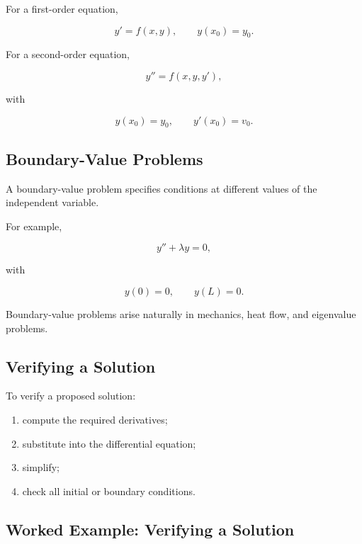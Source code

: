 For a first-order equation,

\[
\boxed{
y'=f(x,y),
\qquad
y(x_0)=y_0.
}
\]

For a second-order equation,

\[
\boxed{
y''=f(x,y,y'),
}
\]

with

\[
\boxed{
y(x_0)=y_0,
\qquad
y'(x_0)=v_0.
}
\]

\subsection{Boundary-Value Problems}
\label{subsec:boundary-value-problems}

A boundary-value problem specifies conditions at different values of the
independent variable.

For example,

\[
\boxed{
y''+\lambda y=0,
}
\]

with

\[
\boxed{
y(0)=0,
\qquad
y(L)=0.
}
\]

Boundary-value problems arise naturally in mechanics, heat flow, and
eigenvalue problems.

\subsection{Verifying a Solution}
\label{subsec:verify-ode-solution}

To verify a proposed solution:

\begin{enumerate}
    \item compute the required derivatives;
    \item substitute into the differential equation;
    \item simplify;
    \item check all initial or boundary conditions.
\end{enumerate}

\subsection{Worked Example: Verifying a Solution}
\label{subsec:worked-verify-ode}

